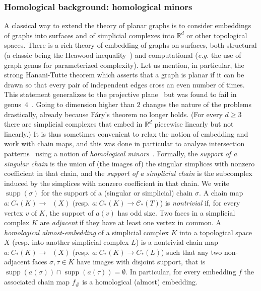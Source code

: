 \documentclass[11pt]{article}
\newcommand{\R}{\mathbb{R}}
\newcommand{\C}{\mathcal{C}}
\DeclareMathOperator{\supp}{supp}
\DeclareMathOperator{\Csing}{C_*^{sing}}
\newcommand{\defn}[1]{\emph{\color{violet}#1}}
\begin{document}
\subsubsection{Homological background: homological minors}
%
A classical way to extend the theory of planar graphs is to consider embeddings of graphs into surfaces and of simplicial complexes into $\R^d$ or other topological spaces.
%
\medskip
%
There is a rich theory of embedding of graphs on surfaces, both structural (a classic being the Heawood inequality~\cite{ringel2012map}) and computational (\emph{e.g.} the use of graph genus for parameterized complexity). Let us mention, in particular, the strong Hanani-Tutte theorem which asserts that a graph is planar if it can be drawn so that every pair of independent edges cross an even number of times. This statement generalizes to the projective plane~\cite{pelsmajer2009strong,de2017direct} but was found to fail in genus~4~\cite{fulek2019counterexample}. 
%
\medskip
%
Going to dimension higher than $2$ changes the nature of the problems drastically, already because Fáry's theorem no longer holds. (For every $d \ge 3$ there are simplicial complexes that embed in $\R^d$ piecewise linearly but not linearly.) It is thus sometimes convenient to relax the notion of embedding and work with chain maps, and this was done in particular to analyze intersection patterns~\cite{hellyBetti,patakova2022bounding,steppingUp} using a notion of \emph{homological minors}~\cite{wagner2012minors}.
%
\medskip
%
Formally, the \defn{support of a singular chain} is the union of (the images of) the singular simplices with nonzero coefficient in that chain, and the  \defn{support of a simplicial chain} is the subcomplex induced by the simplices with nonzero coefficient in that chain.  We write $\supp(\sigma)$ for the support of a (singular or simplicial) chain $\sigma$. A chain map $a:C_*(K)\to \Csing(X)$ (resp. $a:C_*(K)\to \C_*(T)$) is \defn{nontrivial} if, for every vertex $v$ of $K$, the support of $a(v)$ has odd size. Two faces in a simplicial complex $K$ are \defn{adjacent} if they have at least one vertex in common.  A \defn{homological almost-embedding} of a simplicial complex $K$ into a topological space~$X$ (resp. into another simplicial complex $L$) is a nontrivial chain map $a:C_*(K)\to \Csing(X)$ (resp. $a:C_*(K)\to C_*(L)$) such that any two non-adjacent faces $\sigma,\tau \in K$ have images with disjoint support, that is $\supp(a(\sigma)) \cap \supp(a(\tau)) = \emptyset$. In particular, for every embedding $f$ the associated chain map $f_\#$ is a homological (almost) embedding.
\end{document}
